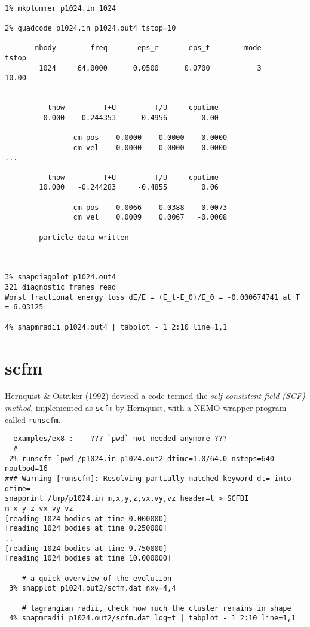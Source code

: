 \footnotesize\begin{verbatim}

1% mkplummer p1024.in 1024

2% quadcode p1024.in p1024.out4 tstop=10

       nbody        freq       eps_r       eps_t        mode       tstop
        1024     64.0000      0.0500      0.0700           3       10.00
 
 
          tnow         T+U         T/U     cputime
         0.000   -0.244353     -0.4956        0.00
 
                cm pos    0.0000   -0.0000    0.0000
                cm vel   -0.0000   -0.0000    0.0000
...

          tnow         T+U         T/U     cputime
        10.000   -0.244283     -0.4855        0.06
 
                cm pos    0.0066    0.0388   -0.0073
                cm vel    0.0009    0.0067   -0.0008
 
        particle data written



3% snapdiagplot p1024.out4
321 diagnostic frames read
Worst fractional energy loss dE/E = (E_t-E_0)/E_0 = -0.000674741 at T = 6.03125

4% snapmradii p1024.out4 | tabplot - 1 2:10 line=1,1

\end{verbatim}\normalsize


\section{scfm}

Hernquist \& Ostriker (1992) deviced a code termed the 
{\it self-consistent field (SCF) method}, implemented as {\tt scfm} by
Hernquist, with a NEMO wrapper program called {\tt runscfm}.

\footnotesize\begin{verbatim}
  examples/ex8 :    ??? `pwd` not needed anymore ???
  #
 2% runscfm `pwd`/p1024.in p1024.out2 dtime=1.0/64.0 nsteps=640 noutbod=16
### Warning [runscfm]: Resolving partially matched keyword dt= into dtime=
snapprint /tmp/p1024.in m,x,y,z,vx,vy,vz header=t > SCFBI
m x y z vx vy vz
[reading 1024 bodies at time 0.000000]
[reading 1024 bodies at time 0.250000]
..
[reading 1024 bodies at time 9.750000]
[reading 1024 bodies at time 10.000000]

    # a quick overview of the evolution 
 3% snapplot p1024.out2/scfm.dat nxy=4,4

    # lagrangian radii, check how much the cluster remains in shape
 4% snapmradii p1024.out2/scfm.dat log=t | tabplot - 1 2:10 line=1,1
 

\end{verbatim}\normalsize

